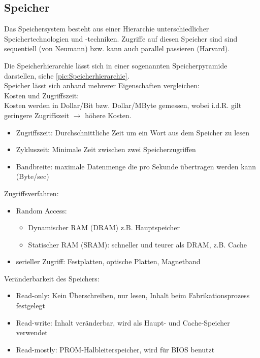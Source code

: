 \documentclass[a4paper,12pt,leqno]{article}
\begin{document}
\subsection{Speicher}

Das Speichersystem besteht aus einer Hierarchie unterschiedlicher Speichertechnologien und -techniken. Zugriffe auf diesen Speicher sind sind sequentiell (von Neumann) bzw. kann auch parallel passieren (Harvard).

Die Speicherhierarchie lässt sich in einer sogenannten Speicherpyramide darstellen, siehe \ref{pic:Speicherhierarchie}.\\

Speicher lässt sich anhand mehrerer Eigenschaften vergleichen:\\

Kosten und Zugriffszeit:\\
Kosten werden in Dollar/Bit bzw. Dollar/MByte gemessen, wobei i.d.R. gilt geringere Zugriffszeit $\rightarrow$ höhere Kosten.
\begin{itemize}
\item Zugriffszeit: Durchschnittliche Zeit um ein Wort aus dem Speicher zu lesen
\item Zykluszeit: Minimale Zeit zwischen zwei Speicherzugriffen
\item Bandbreite: maximale Datenmenge die pro Sekunde übertragen werden kann (Byte/sec)
\end{itemize}

Zugriffsverfahren:
\begin{itemize}
\item Random Access: 
	\begin{itemize}
	\item Dynamischer RAM (DRAM) z.B. Hauptspeicher
	\item Statischer RAM (SRAM): schneller und teurer als DRAM, z.B. Cache
	\end{itemize}
\item serieller Zugriff: Festplatten, optische Platten, Magnetband
\end{itemize}

Veränderbarkeit des Speichers:
\begin{itemize}
\item Read-only: Kein Überschreiben, nur lesen, Inhalt beim Fabrikationsprozess festgelegt
\item Read-write: Inhalt veränderbar, wird als Haupt- und Cache-Speicher  verwendet
\item Read-mostly: PROM-Halbleiterspeicher, wird für BIOS benutzt
\end{itemize}
\end{document}
